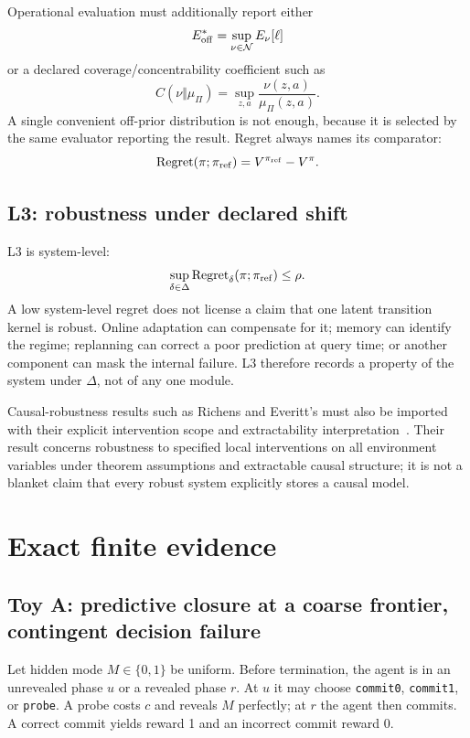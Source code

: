 \documentclass[10pt]{article}
\begin{document}
Operational evaluation must additionally report either
\[
E_{\rm off}^*=\sup_{\nu\in\mathcal N}E_\nu[\ell]
\]
or a declared coverage/concentrability coefficient such as
\[
C(\nu\Vert\mu_\Pi)=\sup_{z,a}\frac{\nu(z,a)}{\mu_\Pi(z,a)}.
\]
A single convenient off-prior distribution is not enough, because it is selected by the same evaluator reporting the result. Regret always names its comparator:
\[
\mathrm{Regret}(\pi;\pi_{\rm ref})=V^{\pi_{\rm ref}}-V^\pi.
\]

\subsection{L3: robustness under declared shift}

L3 is system-level:
\[
\sup_{\delta\in\Delta}
\mathrm{Regret}_\delta(\pi;\pi_{\rm ref})\le\rho.
\]
A low system-level regret does not license a claim that one latent transition kernel is robust. Online adaptation can compensate for it; memory can identify the regime; replanning can correct a poor prediction at query time; or another component can mask the internal failure. L3 therefore records a property of the system under $\Delta$, not of any one module.

Causal-robustness results such as Richens and Everitt's must also be imported with their explicit intervention scope and extractability interpretation~\cite{richens2024}. Their result concerns robustness to specified local interventions on all environment variables under theorem assumptions and extractable causal structure; it is not a blanket claim that every robust system explicitly stores a causal model.

\section{Exact finite evidence}

\subsection{Toy A: predictive closure at a coarse frontier, contingent decision failure}

Let hidden mode $M\in\{0,1\}$ be uniform. Before termination, the agent is in an unrevealed phase $u$ or a revealed phase $r$. At $u$ it may choose \texttt{commit0}, \texttt{commit1}, or \texttt{probe}. A probe costs $c$ and reveals $M$ perfectly; at $r$ the agent then commits. A correct commit yields reward 1 and an incorrect commit reward 0.
\end{document}
